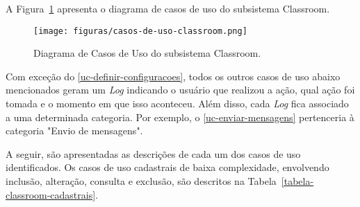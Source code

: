 A Figura~\ref{figura-caso-de-uso-classroom} apresenta o diagrama de casos de uso do subsistema Classroom.

\begin{figure}[h!]
	\centering
	\texttt{[image: figuras/casos-de-uso-classroom.png]}
	\caption{Diagrama de Casos de Uso do subsistema Classroom.}
	\label{figura-caso-de-uso-classroom}
\end{figure}

Com exceção do \ref{uc-definir-configuracoes}, todos os outros casos de uso abaixo mencionados geram um \textit{Log} indicando o usuário que realizou a ação, qual ação foi tomada e o momento em que isso aconteceu. Além disso, cada \textit{Log} fica associado a uma determinada categoria. Por exemplo, o \ref{uc-enviar-mensagens} pertenceria à categoria "Envio de mensagens".


A seguir, são apresentadas as descrições de cada um dos casos de uso identificados. Os casos de uso cadastrais de baixa complexidade, envolvendo inclusão, alteração, consulta e exclusão, são descritos na Tabela~\ref{tabela-classroom-cadastrais}.


